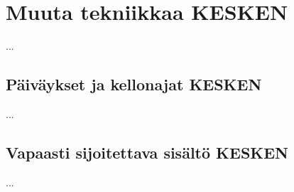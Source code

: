 
\chapter{Muuta tekniikkaa KESKEN}

...

\section{Päiväykset ja kellonajat KESKEN}

...

\section{Vapaasti sijoitettava sisältö KESKEN}

...
